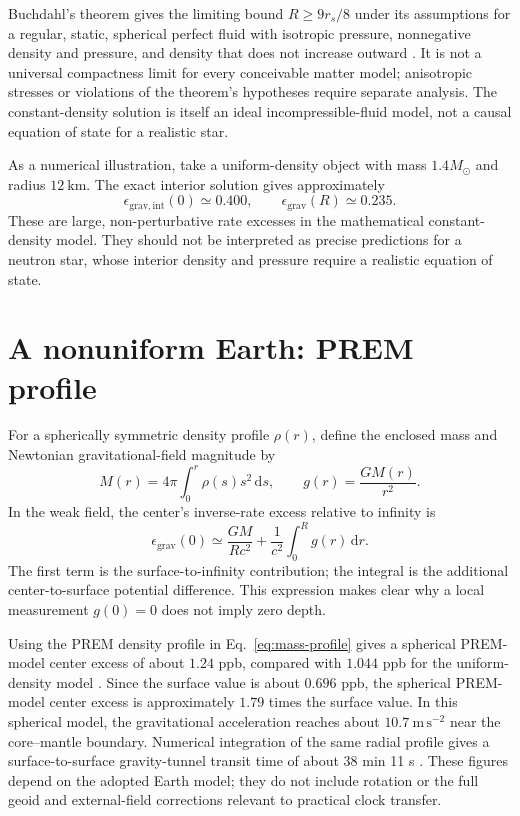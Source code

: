 \documentclass[12pt]{article}
\begin{document}
Buchdahl's theorem gives the limiting bound $R\geq9r_s/8$ under its assumptions for a regular, static, spherical perfect fluid with isotropic pressure, nonnegative density and pressure, and density that does not increase outward \cite{Buchdahl}. It is not a universal compactness limit for every conceivable matter model; anisotropic stresses or violations of the theorem's hypotheses require separate analysis. The constant-density solution is itself an ideal incompressible-fluid model, not a causal equation of state for a realistic star.

As a numerical illustration, take a uniform-density object with mass $1.4M_{\odot}$ and radius $12\ \mathrm{km}$. The exact interior solution gives approximately
\begin{equation}
  \epsilon_{\mathrm{grav,int}}(0)\simeq0.400,
  \qquad
  \epsilon_{\mathrm{grav}}(R)\simeq0.235.
  \label{eq:compact-star-example}
\end{equation}
These are large, non-perturbative rate excesses in the mathematical constant-density model. They should not be interpreted as precise predictions for a neutron star, whose interior density and pressure require a realistic equation of state.

\section{A nonuniform Earth: PREM profile}

For a spherically symmetric density profile $\rho(r)$, define the enclosed mass and Newtonian gravitational-field magnitude by
\begin{equation}
  M(r)=4\pi\int_0^r\rho(s)s^2\,\mathrm{d}s,
  \qquad
  g(r)=\frac{GM(r)}{r^2}.
  \label{eq:mass-profile}
\end{equation}
In the weak field, the center's inverse-rate excess relative to infinity is
\begin{equation}
  \epsilon_{\mathrm{grav}}(0)
  \simeq\frac{GM}{Rc^2}
   +\frac{1}{c^2}\int_0^R g(r)\,\mathrm{d}r.
  \label{eq:center-general-profile}
\end{equation}
The first term is the surface-to-infinity contribution; the integral is the additional center-to-surface potential difference. This expression makes clear why a local measurement $g(0)=0$ does not imply zero depth.

Using the PREM density profile in Eq.~\eqref{eq:mass-profile} gives a spherical PREM-model center excess of about $1.24$ ppb, compared with $1.044$ ppb for the uniform-density model \cite{PREM}. Since the surface value is about $0.696$ ppb, the spherical PREM-model center excess is approximately $1.79$ times the surface value. In this spherical model, the gravitational acceleration reaches about $10.7\ \mathrm{m\,s^{-2}}$ near the core--mantle boundary. Numerical integration of the same radial profile gives a surface-to-surface gravity-tunnel transit time of about 38 min 11 s \cite{PREM,Klotz}. These figures depend on the adopted Earth model; they do not include rotation or the full geoid and external-field corrections relevant to practical clock transfer.
\end{document}
